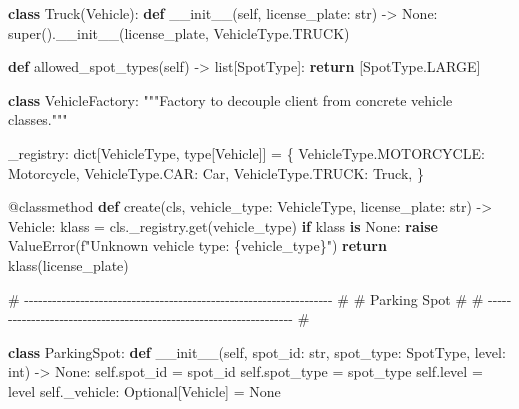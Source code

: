 \documentclass[11pt]{article}
\newenvironment{Shaded}{\begin{snugshade}}{\end{snugshade}}
\newcommand{\AttributeTok}[1]{\textcolor[rgb]{0.16,0.50,0.73}{#1}}
\newcommand{\BuiltInTok}[1]{\textcolor[rgb]{0.50,0.55,0.55}{#1}}
\newcommand{\CommentTok}[1]{\textcolor[rgb]{0.48,0.49,0.49}{#1}}
\newcommand{\ControlFlowTok}[1]{\textcolor[rgb]{0.99,0.74,0.29}{\textbf{#1}}}
\newcommand{\FunctionTok}[1]{\textcolor[rgb]{0.56,0.27,0.68}{#1}}
\newcommand{\KeywordTok}[1]{\textcolor[rgb]{0.81,0.81,0.76}{\textbf{#1}}}
\newcommand{\NormalTok}[1]{\textcolor[rgb]{0.81,0.81,0.76}{#1}}
\newcommand{\OperatorTok}[1]{\textcolor[rgb]{0.81,0.81,0.76}{#1}}
\newcommand{\PreprocessorTok}[1]{\textcolor[rgb]{0.15,0.68,0.38}{#1}}
\newcommand{\SpecialCharTok}[1]{\textcolor[rgb]{0.24,0.68,0.91}{#1}}
\newcommand{\SpecialStringTok}[1]{\textcolor[rgb]{0.85,0.27,0.33}{#1}}
\newcommand{\VariableTok}[1]{\textcolor[rgb]{0.15,0.68,0.68}{#1}}
\begin{document}
\begin{Shaded}
\begin{Highlighting}[]
\KeywordTok{class}\NormalTok{ Truck(Vehicle):}
    \KeywordTok{def} \FunctionTok{\_\_init\_\_}\NormalTok{(}\VariableTok{self}\NormalTok{, license\_plate: }\BuiltInTok{str}\NormalTok{) }\OperatorTok{{-}\textgreater{}} \VariableTok{None}\NormalTok{:}
        \BuiltInTok{super}\NormalTok{().}\FunctionTok{\_\_init\_\_}\NormalTok{(license\_plate, VehicleType.TRUCK)}

    \KeywordTok{def}\NormalTok{ allowed\_spot\_types(}\VariableTok{self}\NormalTok{) }\OperatorTok{{-}\textgreater{}} \BuiltInTok{list}\NormalTok{[SpotType]:}
        \ControlFlowTok{return}\NormalTok{ [SpotType.LARGE]}


\KeywordTok{class}\NormalTok{ VehicleFactory:}
    \CommentTok{"""Factory to decouple client from concrete vehicle classes."""}

\NormalTok{    \_registry: }\BuiltInTok{dict}\NormalTok{[VehicleType, }\BuiltInTok{type}\NormalTok{[Vehicle]] }\OperatorTok{=}\NormalTok{ \{}
\NormalTok{        VehicleType.MOTORCYCLE: Motorcycle,}
\NormalTok{        VehicleType.CAR: Car,}
\NormalTok{        VehicleType.TRUCK: Truck,}
\NormalTok{    \}}

    \AttributeTok{@classmethod}
    \KeywordTok{def}\NormalTok{ create(cls, vehicle\_type: VehicleType, license\_plate: }\BuiltInTok{str}\NormalTok{) }\OperatorTok{{-}\textgreater{}}\NormalTok{ Vehicle:}
\NormalTok{        klass }\OperatorTok{=}\NormalTok{ cls.\_registry.get(vehicle\_type)}
        \ControlFlowTok{if}\NormalTok{ klass }\KeywordTok{is} \VariableTok{None}\NormalTok{:}
            \ControlFlowTok{raise} \PreprocessorTok{ValueError}\NormalTok{(}\SpecialStringTok{f"Unknown vehicle type: }\SpecialCharTok{\{}\NormalTok{vehicle\_type}\SpecialCharTok{\}}\SpecialStringTok{"}\NormalTok{)}
        \ControlFlowTok{return}\NormalTok{ klass(license\_plate)}


\CommentTok{\# {-}{-}{-}{-}{-}{-}{-}{-}{-}{-}{-}{-}{-}{-}{-}{-}{-}{-}{-}{-}{-}{-}{-}{-}{-}{-}{-}{-}{-}{-}{-}{-}{-}{-}{-}{-}{-}{-}{-}{-}{-}{-}{-}{-}{-}{-}{-}{-}{-}{-}{-}{-}{-}{-}{-}{-}{-}{-}{-}{-}{-}{-}{-}{-}{-}{-} \#}
\CommentTok{\# Parking Spot                                                        \#}
\CommentTok{\# {-}{-}{-}{-}{-}{-}{-}{-}{-}{-}{-}{-}{-}{-}{-}{-}{-}{-}{-}{-}{-}{-}{-}{-}{-}{-}{-}{-}{-}{-}{-}{-}{-}{-}{-}{-}{-}{-}{-}{-}{-}{-}{-}{-}{-}{-}{-}{-}{-}{-}{-}{-}{-}{-}{-}{-}{-}{-}{-}{-}{-}{-}{-}{-}{-}{-} \#}

\KeywordTok{class}\NormalTok{ ParkingSpot:}
    \KeywordTok{def} \FunctionTok{\_\_init\_\_}\NormalTok{(}\VariableTok{self}\NormalTok{, spot\_id: }\BuiltInTok{str}\NormalTok{, spot\_type: SpotType, level: }\BuiltInTok{int}\NormalTok{) }\OperatorTok{{-}\textgreater{}} \VariableTok{None}\NormalTok{:}
        \VariableTok{self}\NormalTok{.spot\_id }\OperatorTok{=}\NormalTok{ spot\_id}
        \VariableTok{self}\NormalTok{.spot\_type }\OperatorTok{=}\NormalTok{ spot\_type}
        \VariableTok{self}\NormalTok{.level }\OperatorTok{=}\NormalTok{ level}
        \VariableTok{self}\NormalTok{.\_vehicle: Optional[Vehicle] }\OperatorTok{=} \VariableTok{None}


\end{Highlighting}
\end{Shaded}
\end{document}
